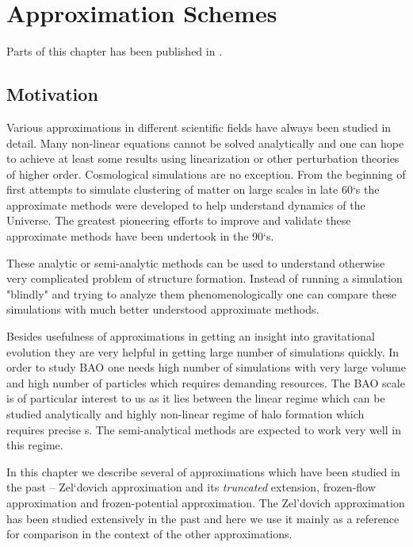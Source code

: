\chapter{Approximation Schemes}
Parts of this chapter has been published in \textcite{2020MNRAS.493.2085V}.

\section{Motivation}
Various approximations in different scientific fields have always been studied in detail. Many non-linear equations cannot be solved analytically and one can hope to achieve at least some results using linearization or other perturbation theories of higher order. Cosmological simulations are no exception. From the beginning of first attempts to simulate clustering of matter on large scales in late 60`s the approximate methods were developed to help understand dynamics of the Universe. The greatest pioneering efforts to improve and validate these approximate methods have been undertook in the 90`s.

These analytic or semi-analytic methods can be used to understand otherwise very complicated problem of structure formation. Instead of running a simulation "blindly" and trying to analyze them phenomenologically one can compare these simulations with much better understood approximate methods.

Besides usefulness of approximations in getting an insight into gravitational evolution they are very helpful in getting large number of simulations quickly. In order to study BAO one needs high number of simulations with very large volume and high number of particles which requires demanding resources. The BAO scale is of particular interest to us as it lies between the linear regime which can be studied analytically and highly non-linear regime of halo formation which requires precise \nbodysim s. The semi-analytical methods are expected to work very well in this regime.

In this chapter we describe several of approximations which have been studied in the past -- Zel`dovich approximation and its \textit{truncated} extension, frozen-flow approximation and frozen-potential approximation. The Zel'dovich approximation has been studied extensively in the past and here we use it mainly as a reference for comparison in the context of the other approximations.

